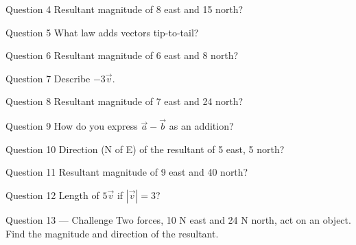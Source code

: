 \documentclass[11pt]{article}
\begin{document}
\begin{qbox}{Question 4}
Resultant magnitude of 8 east and 15 north?\workspace{2.4cm}
\end{qbox}

\begin{qbox}{Question 5}
What law adds vectors tip-to-tail?\workspace{2.4cm}
\end{qbox}

\begin{qbox}{Question 6}
Resultant magnitude of 6 east and 8 north?\workspace{2.4cm}
\end{qbox}

\begin{qbox}{Question 7}
Describe $-3\vec v$.\workspace{2.4cm}
\end{qbox}

\begin{qbox}{Question 8}
Resultant magnitude of 7 east and 24 north?\workspace{2.4cm}
\end{qbox}

\begin{qbox}{Question 9}
How do you express $\vec a-\vec b$ as an addition?\workspace{2.4cm}
\end{qbox}

\begin{qbox}{Question 10}
Direction (N of E) of the resultant of 5 east, 5 north?\workspace{2.4cm}
\end{qbox}

\begin{qbox}{Question 11}
Resultant magnitude of 9 east and 40 north?\workspace{2.4cm}
\end{qbox}

\begin{qbox}{Question 12}
Length of $5\vec v$ if $|\vec v|=3$?\workspace{2.4cm}
\end{qbox}

\begin{qbox}{Question 13 --- Challenge}
Two forces, 10 N east and 24 N north, act on an object. Find the magnitude and direction of the resultant.\workspace{3cm}
\end{qbox}

\clearpage
{}
\end{document}
